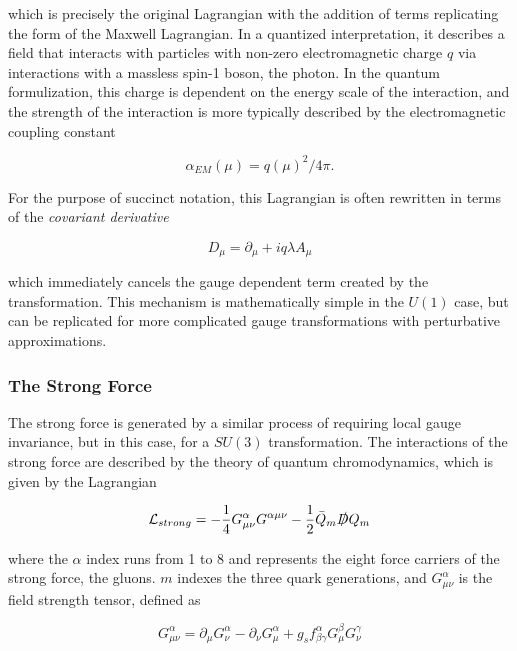 which is precisely the original Lagrangian with the addition of terms replicating the form of the Maxwell Lagrangian. In a quantized interpretation, it describes a field that interacts with particles with non-zero electromagnetic charge $q$ via interactions with a massless spin-1 boson, the photon. In the quantum formulization, this charge is dependent on the energy scale of the interaction, and the strength of the interaction is more typically described by the electromagnetic coupling constant

\begin{equation}
\alpha_{EM}(\mu) =  q(\mu)^2 / 4\pi . 
\end{equation}

For the purpose of succinct notation, this Lagrangian is often rewritten in terms of the \textit{covariant derivative}

\begin{equation}
D_\mu = \partial_\mu + iq\lambda A_\mu
\end{equation}

which immediately cancels the gauge dependent term created by the transformation. This mechanism is mathematically simple in the $U(1)$ case, but can be replicated for more complicated gauge transformations with perturbative approximations. 


\subsubsection{The Strong Force}
\label{sec:strong}

The strong force is generated by a similar process of requiring local gauge invariance, but in this case, for a $SU(3)$ transformation. The interactions of the strong force are described by the theory of quantum chromodynamics, which is given by the Lagrangian

\begin{equation}
\mathcal{L}_{strong} = -\frac{1}{4}G^\alpha_{\mu\nu}G^{\alpha\mu\nu} - \frac{1}{2}\bar{Q}_m \slashed{D} Q_m
\end{equation}

where the $\alpha$ index runs from 1 to 8 and represents the eight force carriers of the strong force, the gluons. $m$ indexes the three quark generations, and $G^\alpha_{\mu\nu}$ is the field strength tensor, defined as

\begin{equation}
G^\alpha_{\mu\nu} = \partial_\mu G^\alpha_\nu - \partial_\nu G^\alpha_\mu + g_s f^\alpha_{\beta\gamma}G^\beta_\mu G^\gamma_\nu
\end{equation}

